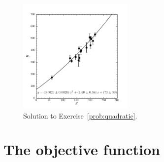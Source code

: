 \documentclass[12pt,twoside]{article}
\newcommand{\problemname}{Exercise}
\newcounter{problem}
\begin{document}
\begin{figure}[htb]
\includegraphics[width=0.5\textwidth]{ex3.png}
\caption{Solution to \problemname~\ref{prob:quadratic}.}\label{fig:quadratic}
\end{figure}

\section{The objective function}\label{sec:objective}
\end{document}

